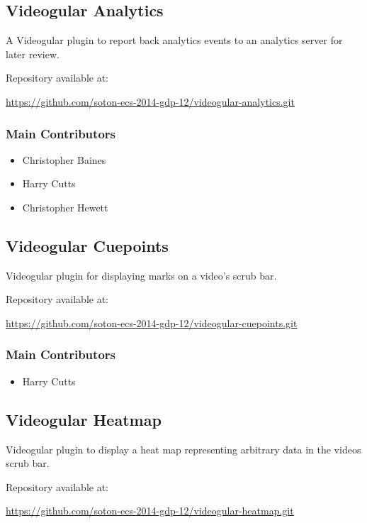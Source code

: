 \subsection{Videogular Analytics}
\label{Section:Repo_videogular_analytics}

A \gls{Videogular} plugin to report back analytics events to an analytics server for later review.

Repository available at:

\url{https://github.com/soton-ecs-2014-gdp-12/videogular-analytics.git}

\subsubsection{Main Contributors}
\begin{itemize}
  \item Christopher Baines
  \item Harry Cutts
  \item Christopher Hewett
\end{itemize}

\subsection{Videogular Cuepoints}
\label{Section:Repo_videogular_cuepoints}

Videogular plugin for displaying marks on a video's scrub bar.

Repository available at:

\url{https://github.com/soton-ecs-2014-gdp-12/videogular-cuepoints.git}

\subsubsection{Main Contributors}
\begin{itemize}
  \item Harry Cutts
\end{itemize}

\subsection{Videogular Heatmap}
\label{Section:Repo_videogular_heatmap}

Videogular plugin to display a heat map representing arbitrary data in the videos scrub bar.

Repository available at:

\url{https://github.com/soton-ecs-2014-gdp-12/videogular-heatmap.git}

